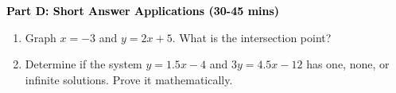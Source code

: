 \documentclass[12pt, letterpaper, fleqn]{article}
\begin{document}
\newpage

\begin{tcolorbox}[colback=customteal!20]
\large\textcolor{black}{\textbf{Part D: Short Answer Applications (30-45 mins)}}
\end{tcolorbox}

\vspace{3mm}

\begin{enumerate}[itemsep=4.2cm, leftmargin=0.6cm, resume]
\item Graph $x = -3$ and $y = 2x + 5$. What is the intersection point?
\item Determine if the system $y = 1.5x - 4$ and $3y = 4.5x - 12$ has one, none, or infinite solutions. Prove it mathematically.
\end{enumerate}
\end{document}
